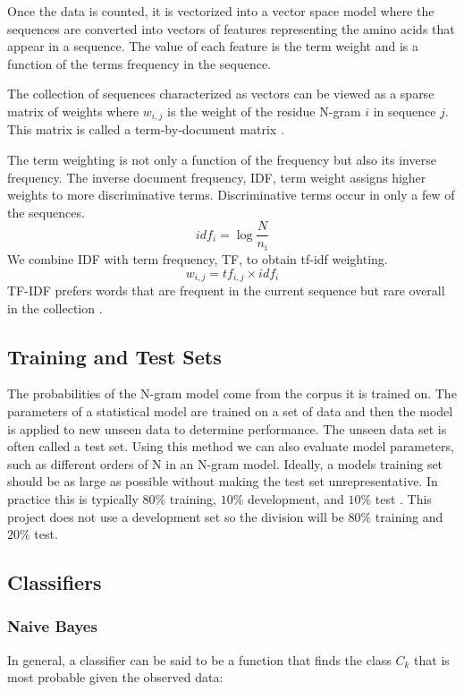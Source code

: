\documentclass[10pt,letterpaper]{article}
\begin{document}
	Once the data is counted, it is vectorized into a vector space model where the sequences are converted into vectors of features representing the amino acids that appear in a sequence. The value of each feature is the term weight and is a function of the terms frequency in the sequence.
	
	The collection of sequences characterized as vectors can be viewed as a sparse matrix of weights where $w_{i,j}$ is the weight of the residue N-gram $i$ in sequence $j$. This matrix is called a term-by-document matrix \cite{jurafsky}.  
	
	The term weighting is not only a function of the frequency but also its inverse frequency. The inverse document frequency, IDF, term weight assigns higher weights to more discriminative terms. Discriminative terms occur in only a few of the sequences. 
	$$ idf_i = \log {\frac{N}{n_i}}$$ We combine IDF with term frequency, TF, to obtain tf-idf weighting. $$w_{i,j} = tf_{i,j} \times idf_i$$ TF-IDF prefers words that are frequent in the current sequence but rare overall in the collection \cite{jurafsky}.
	
	\subsection*{Training and Test Sets}
	The probabilities of the N-gram model come from the corpus it is trained on. The parameters of a statistical model are trained on a set of data and then the model is applied to new unseen data to determine performance. The unseen data set is often called a test set. Using this method we can also evaluate model parameters, such as different orders of N in an N-gram model. Ideally, a models training set should be as large as possible without making the test set unrepresentative. In practice this is typically $80\%$ training, $10\%$ development, and $10\%$ test \cite{jurafsky}. This project does not use a development set so the division will be $80\%$ training and $20\%$ test. 
	
	\subsection*{Classifiers}
	\subsubsection*{Naive Bayes}
	In general, a classifier can be said to be a function that finds the class $C_k$ that is most probable given the observed data:
	
\end{document}
